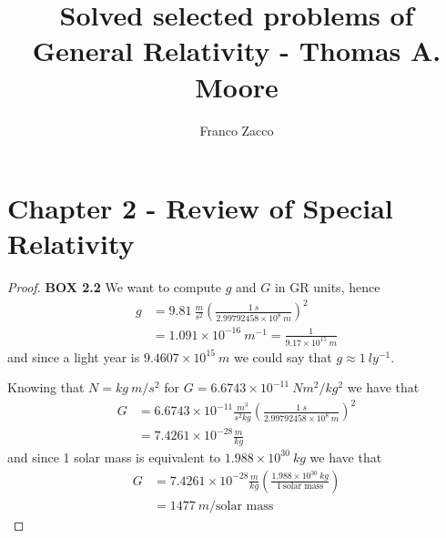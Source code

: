 \documentclass[11pt]{article}
\title{\textbf{Solved selected problems of General Relativity - Thomas A. Moore}}
\author{Franco Zacco}
\date{}
\theoremstyle{definition}
\begin{document}
\maketitle
\thispagestyle{empty}

\section*{Chapter 2 - Review of Special Relativity}

\begin{proof}{\textbf{BOX 2.2}}
    We want to compute $g$ and $G$ in GR units, hence
    \begin{align*}
        g &= 9.81~\frac{m}{s^2}\left(\frac{1~s}{2.99792458 \times 10^8~m}\right)^2\\
          &= 1.091 \times 10^{-16}~m^{-1} = \frac{1}{9.17 \times 10^{15}~m}
    \end{align*}
    and since a light year is $9.4607 \times 10^{15}~m$ we could say that
    $g \approx 1~ly^{-1}$.
    
    Knowing that $N = kg~m/s^2$ for $G = 6.6743 \times 10^{-11}~Nm^2/kg^2$
    we have that
    \begin{align*}
        G &= 6.6743 \times 10^{-11} \frac{m^3}{s^2kg}
        \left(\frac{1~s}{2.99792458 \times 10^8~m}\right)^2\\
        &= 7.4261\times 10^{-28} \frac{m}{kg}
    \end{align*}
    and since 1 solar mass is equivalent to $1.988 \times 10^{30}~kg$
    we have that
    \begin{align*}
        G &= 7.4261\times 10^{-28} \frac{m}{kg}
        \left(\frac{1.988 \times 10^{30}~kg}{1~\text{solar mass}}\right)\\
        &= 1477~m/\text{solar mass}
    \end{align*}
\end{proof}
\cleardoublepage
\end{document}
